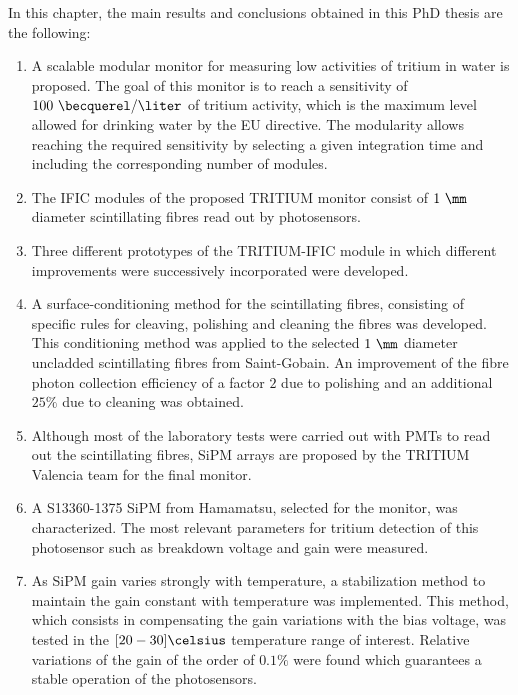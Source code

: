 In this chapter, the main results and conclusions obtained in this PhD thesis are the following:

\begin{enumerate}
\item{} A scalable modular monitor for measuring low activities of tritium in water is proposed. The goal of this monitor is to reach a sensitivity of $100~\becquerel/\liter$ of tritium activity, which is the maximum level allowed for drinking water by the EU directive. The modularity allows reaching the required sensitivity by selecting a given integration time and including the corresponding number of modules.

\item{} The IFIC modules of the proposed TRITIUM monitor consist of $1~\mm$ diameter scintillating fibres read out by photosensors.

\item{} Three different prototypes of the TRITIUM-IFIC module in which different improvements were successively incorporated were developed.

\item{} A surface-conditioning method for the scintillating fibres, consisting of specific rules for cleaving, polishing and cleaning the fibres was developed. This conditioning method was applied to the selected $1~\mm$ diameter uncladded scintillating fibres from Saint-Gobain. An improvement of the fibre photon collection efficiency of a factor $2$ due to polishing and an additional $25\%$ due to cleaning was obtained.

\item{} Although most of the laboratory tests were carried out with PMTs to read out the scintillating fibres, SiPM arrays are proposed by the TRITIUM Valencia team for the final monitor.

\item{} A S13360-1375 SiPM from Hamamatsu, selected for the monitor, was characterized. The most relevant parameters for tritium detection of this photosensor such as breakdown voltage and gain were measured.

\item{} As SiPM gain varies strongly with temperature, a stabilization method to maintain the gain constant with temperature was implemented. This method, which consists in compensating the gain variations with the bias voltage, was tested in the $[20-30]\celsius$ temperature range of interest. Relative variations of the gain of the order of $0.1\%$ were found which guarantees a stable operation of the photosensors.


\end{enumerate}
